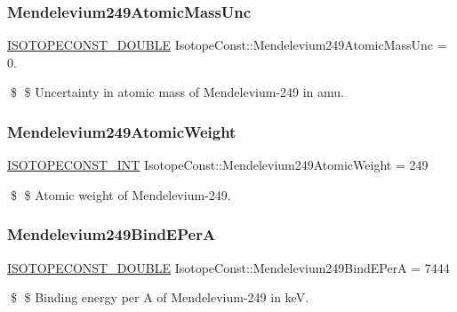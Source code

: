 \subsubsection{\texorpdfstring{Mendelevium249\+Atomic\+Mass\+Unc}{Mendelevium249AtomicMassUnc}}
{\footnotesize\ttfamily \mbox{\hyperlink{group___isotope_const-_macros_ga8f45a7272ce02c0b4c65c44636ed719a}{I\+S\+O\+T\+O\+P\+E\+C\+O\+N\+S\+T\+\_\+\+D\+O\+U\+B\+LE}} Isotope\+Const\+::\+Mendelevium249\+Atomic\+Mass\+Unc = 0.}

\$ \$ Uncertainty in atomic mass of Mendelevium-\/249 in amu. \mbox{\label{group___isotope_const-_mendelevium-_md249_ga21855ccb529f6df8247663fe76c4a98f}} 
\subsubsection{\texorpdfstring{Mendelevium249\+Atomic\+Weight}{Mendelevium249AtomicWeight}}
{\footnotesize\ttfamily \mbox{\hyperlink{group___isotope_const-_macros_ga5f18360b3e99483a35c32d789e62621c}{I\+S\+O\+T\+O\+P\+E\+C\+O\+N\+S\+T\+\_\+\+I\+NT}} Isotope\+Const\+::\+Mendelevium249\+Atomic\+Weight = 249}

\$ \$ Atomic weight of Mendelevium-\/249. \mbox{\label{group___isotope_const-_mendelevium-_md249_gaf531ab66737a742265eb7b72034a6925}} 
\subsubsection{\texorpdfstring{Mendelevium249\+Bind\+E\+PerA}{Mendelevium249BindEPerA}}
{\footnotesize\ttfamily \mbox{\hyperlink{group___isotope_const-_macros_ga8f45a7272ce02c0b4c65c44636ed719a}{I\+S\+O\+T\+O\+P\+E\+C\+O\+N\+S\+T\+\_\+\+D\+O\+U\+B\+LE}} Isotope\+Const\+::\+Mendelevium249\+Bind\+E\+PerA = 7444}

\$ \$ Binding energy per A of Mendelevium-\/249 in keV. \mbox{\label{group___isotope_const-_mendelevium-_md249_gaa47f4ce2a7724bd03008096575b01c70}} 
